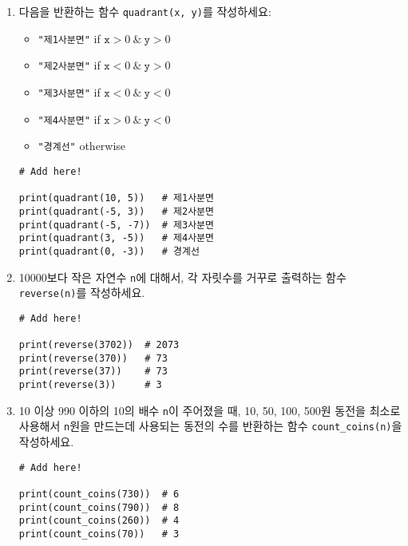 \documentclass[../main.tex]{subfiles}
\begin{document}
\begin{enumerate}
\item 다음을 반환하는 함수 \texttt{quadrant(x, y)}를 작성하세요:
\begin{itemize}
  \item \texttt{"제1사분면"} if $\texttt{x} > 0\ \&\ \texttt{y} > 0$
  \item \texttt{"제2사분면"} if $\texttt{x} < 0\ \&\ \texttt{y} > 0$
  \item \texttt{"제3사분면"} if $\texttt{x} < 0\ \&\ \texttt{y} < 0$
  \item \texttt{"제4사분면"} if $\texttt{x} > 0\ \&\ \texttt{y} < 0$
\item \texttt{"경계선"} otherwise
\end{itemize}
\begin{verbatim}
# Add here!

print(quadrant(10, 5))   # 제1사분면
print(quadrant(-5, 3))   # 제2사분면
print(quadrant(-5, -7))  # 제3사분면
print(quadrant(3, -5))   # 제4사분면
print(quadrant(0, -3))   # 경계선
\end{verbatim}

\item 10000보다 작은 자연수 \texttt{n}에 대해서, 각 자릿수를 거꾸로 출력하는
  함수 \texttt{reverse(n)}를 작성하세요.
\begin{verbatim}
# Add here!

print(reverse(3702))  # 2073
print(reverse(370))   # 73
print(reverse(37))    # 73
print(reverse(3))     # 3
\end{verbatim}

\item 10 이상 990 이하의 10의 배수 \verb|n|이 주어졌을 때, 10, 50, 100, 500원
  동전을 최소로 사용해서 \verb|n|원을 만드는데 사용되는 동전의 수를 반환하는
  함수 \verb|count_coins(n)|을 작성하세요.
\begin{verbatim}
# Add here!

print(count_coins(730))  # 6
print(count_coins(790))  # 8
print(count_coins(260))  # 4
print(count_coins(70))   # 3
\end{verbatim}


\end{enumerate}
\end{document}
